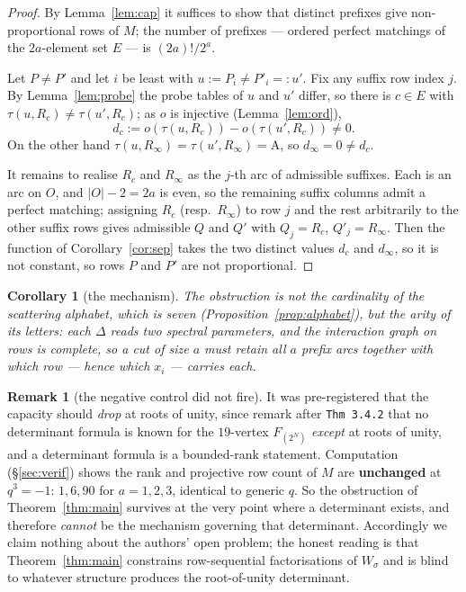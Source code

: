 \documentclass[11pt]{article}
\theoremstyle{plain}
\newtheorem{cor}[thm]{Corollary}
\theoremstyle{definition}
\newtheorem{rem}[thm]{Remark}
\newcommand{\Dl}{\Delta}
\begin{document}
\begin{proof}
By Lemma~\ref{lem:cap} it suffices to show that distinct prefixes give
non-proportional rows of $M$; the number of prefixes --- ordered perfect
matchings of the $2a$-element set $E$ --- is $(2a)!/2^{a}$.

Let $P\neq P'$ and let $i$ be least with $u:=P_i\neq P'_i=:u'$. Fix any suffix
row index $j$. By Lemma~\ref{lem:probe} the probe tables of $u$ and $u'$ differ,
so there is $c\in E$ with $\tau(u,R_c)\neq\tau(u',R_c)$; as $o$ is injective
(Lemma~\ref{lem:ord}),
\[
d_c:=o(\tau(u,R_c))-o(\tau(u',R_c))\neq 0 .
\]
On the other hand $\tau(u,R_\infty)=\tau(u',R_\infty)=\mathrm A$, so
$d_\infty=0\neq d_c$.

It remains to realise $R_c$ and $R_\infty$ as the $j$-th arc of admissible
suffixes. Each is an arc on $O$, and $|O|-2=2a$ is even, so the remaining
suffix columns admit a perfect matching; assigning $R_c$ (resp.\ $R_\infty$) to
row $j$ and the rest arbitrarily to the other suffix rows gives admissible
$Q$ and $Q'$ with $Q_j=R_c$, $Q'_j=R_\infty$. Then the function of
Corollary~\ref{cor:sep} takes the two distinct values $d_c$ and $d_\infty$, so
it is not constant, so rows $P$ and $P'$ are not proportional.
\end{proof}

\begin{cor}[the mechanism]\label{cor:mech}
The obstruction is not the cardinality of the scattering alphabet, which is
seven (Proposition~\ref{prop:alphabet}), but the \emph{arity} of its letters:
each $\Dl$ reads two spectral parameters, and the interaction graph on rows is
complete, so a cut of size $a$ must retain all $a$ prefix arcs together with
which row --- hence which $x_i$ --- carries each.
\end{cor}

\begin{rem}[the negative control did not fire]\label{rem:rootofunity}
It was pre-registered that the capacity should \emph{drop} at roots of unity,
since \cite{GGW} remark after \texttt{Thm 3.4.2} that no determinant formula is
known for the $19$-vertex $F_{(2^N)}$ \emph{except} at roots of unity, and a
determinant formula is a bounded-rank statement. Computation
(\S\ref{sec:verif}) shows the rank and projective row count of $M$ are
\textbf{unchanged} at $q^3=-1$: $1,6,90$ for $a=1,2,3$, identical to generic
$q$. So the obstruction of Theorem~\ref{thm:main} survives at the very point
where a determinant exists, and therefore \emph{cannot} be the mechanism
governing that determinant. Accordingly we claim nothing about the authors'
open problem; the honest reading is that Theorem~\ref{thm:main} constrains
row-sequential factorisations of $W_\sigma$ and is blind to whatever structure
produces the root-of-unity determinant.
\end{rem}
\end{document}
